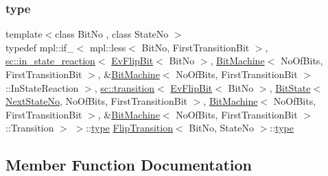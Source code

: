 \subsubsection{\texorpdfstring{type}{type}\hspace{0.1cm}{\footnotesize\ttfamily [2/2]}}
{\footnotesize\ttfamily template$<$class Bit\+No , class State\+No $>$ \\
typedef mpl\+::if\+\_\+$<$ mpl\+::less$<$ Bit\+No, First\+Transition\+Bit $>$, \mbox{\hyperlink{classboost_1_1statechart_1_1in__state__reaction}{sc\+::in\+\_\+state\+\_\+reaction}}$<$ \mbox{\hyperlink{struct_ev_flip_bit}{Ev\+Flip\+Bit}}$<$ Bit\+No $>$, \mbox{\hyperlink{struct_bit_machine}{Bit\+Machine}}$<$ No\+Of\+Bits, First\+Transition\+Bit $>$, \&\mbox{\hyperlink{struct_bit_machine}{Bit\+Machine}}$<$ No\+Of\+Bits, First\+Transition\+Bit $>$\+::In\+State\+Reaction $>$, \mbox{\hyperlink{classboost_1_1statechart_1_1transition}{sc\+::transition}}$<$ \mbox{\hyperlink{struct_ev_flip_bit}{Ev\+Flip\+Bit}}$<$ Bit\+No $>$, \mbox{\hyperlink{struct_bit_state}{Bit\+State}}$<$ \mbox{\hyperlink{struct_flip_transition_a16b33cbdacbffc0e20e2ae9c76e8f645}{Next\+State\+No}}, No\+Of\+Bits, First\+Transition\+Bit $>$, \mbox{\hyperlink{struct_bit_machine}{Bit\+Machine}}$<$ No\+Of\+Bits, First\+Transition\+Bit $>$, \&\mbox{\hyperlink{struct_bit_machine}{Bit\+Machine}}$<$ No\+Of\+Bits, First\+Transition\+Bit $>$\+::Transition $>$ $>$\+::\mbox{\hyperlink{struct_flip_transition_acb1fc32084f19c5bd106af2da39df89e}{type}} \mbox{\hyperlink{struct_flip_transition}{Flip\+Transition}}$<$ Bit\+No, State\+No $>$\+::\mbox{\hyperlink{struct_flip_transition_acb1fc32084f19c5bd106af2da39df89e}{type}}}



\subsection{Member Function Documentation}
\mbox{\label{struct_flip_transition_a242a3dee150500fdcfdd980ca82a45e4}} 
